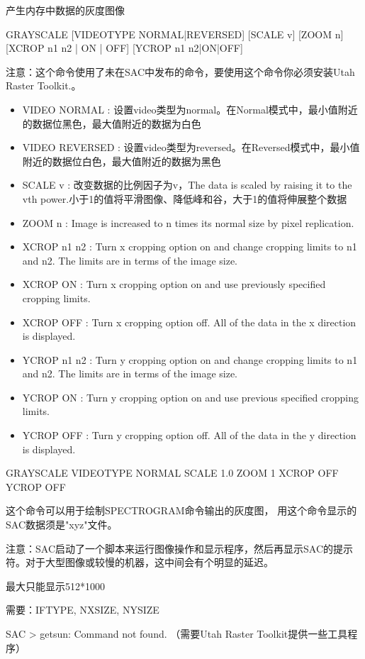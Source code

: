 \label{cmd:grayscale}

产生内存中数据的灰度图像

\begin{SACSTX}
GRAYSCALE [VIDEOTYPE NORMAL|REVERSED] [SCALE v] [ZOOM n] [XCROP n1 n2 | ON | OFF] 
    [YCROP n1 n2|ON|OFF]
\end{SACSTX}

注意：这个命令使用了未在SAC中发布的命令，要使用这个命令你必须安装Utah Raster Toolkit.。

\begin{itemize}
\item VIDEO NORMAL : 设置video类型为normal。在Normal模式中，最小值附近的数据位黑色，最大值附近的数据为白色
\item VIDEO REVERSED : 设置video类型为reversed。在Reversed模式中，最小值附近的数据位白色，最大值附近的数据为黑色
\item SCALE v : 改变数据的比例因子为v，The data is scaled by raising it to the vth power.小于1的值将平滑图像、降低峰和谷，大于1的值将伸展整个数据
\item ZOOM n : Image is increased to n times its normal size by pixel replication.
\item XCROP n1 n2 : Turn x cropping option on and change cropping limits to n1 and n2. The limits are in terms of the image size.
\item XCROP {ON} : Turn x cropping option on and use previously specified cropping limits.
\item XCROP OFF :  Turn x cropping option off.  All of the data in the x direction is displayed.
\item YCROP n1 n2 : Turn y cropping option on and change cropping limits to n1 and n2. The limits are in terms of the image size.
\item YCROP {ON} : Turn y cropping option on and use previous specified cropping limits.
\item YCROP OFF :  Turn y cropping option off.  All of the data in the y direction is displayed. 
\end{itemize}

\begin{SACDFT}
GRAYSCALE VIDEOTYPE NORMAL SCALE 1.0 ZOOM 1 XCROP OFF YCROP OFF
\end{SACDFT}

这个命令可以用于绘制SPECTROGRAM命令输出的灰度图， 用这个命令显示的SAC数据须是"xyz"文件。

注意：SAC启动了一个脚本来运行图像操作和显示程序，然后再显示SAC的提示符。对于大型图像或较慢的机器，这中间会有个明显的延迟。

最大只能显示512*1000

需要：IFTYPE, NXSIZE, NYSIZE

SAC > getsun: Command not found.  （需要Utah Raster Toolkit提供一些工具程序）

